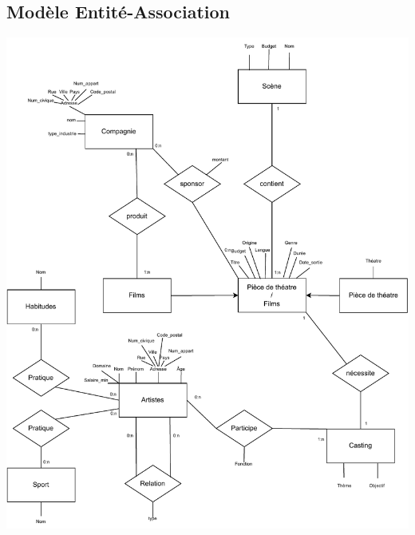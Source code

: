 \documentclass{article}
\begin{document}
\subsection{Modèle Entité-Association}
\begin{center}
\includegraphics[scale=0.9]{../modeleEA.pdf}
\end{center}
  
\newpage
\end{document}
